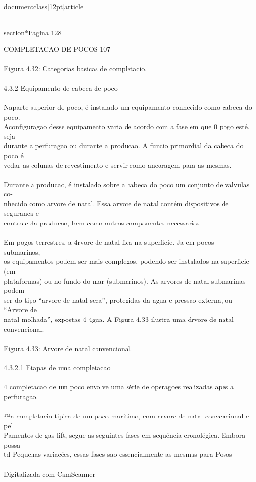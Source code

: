 \\documentclass[12pt]{article}
\begin{document}
\\section*{Pagina 128}

COMPLETACAO DE POCOS 107\\
\\
Figura 4.32: Categorias basicas de completacio.\\
\\
4.3.2 Equipamento de cabeca de poco\\
\\
Naparte superior do poco, é instalado um equipamento conhecido como cabeca do poco.\\
Aconfiguragao desse equipamento varia de acordo com a fase em que 0 pogo esté, seja\\
durante a perfuragao ou durante a producao. A funcio primordial da cabeca do poco é\\
vedar as colunas de revestimento e servir como ancoragem para as mesmas.\\
\\
Durante a producao, é instalado sobre a cabeca do poco um conjunto de valvulas co-\\
nhecido como arvore de natal. Essa arvore de natal contém dispositivos de seguranca e\\
controle da producao, bem como outros componentes necessarios.\\
\\
Em pogos terrestres, a 4rvore de natal fica na superficie. Ja em pocos submarinos,\\
os equipamentos podem ser mais complexos, podendo ser instalados na superficie (em\\
plataformas) ou no fundo do mar (submarinos). As arvores de natal submarinas podem\\
ser do tipo “arvore de natal seca”, protegidas da agua e pressao externa, ou “Arvore de\\
natal molhada”, expostas 4 4gua. A Figura 4.33 ilustra uma drvore de natal convencional.\\
\\
Figura 4.33: Arvore de natal convencional.\\
\\
4.3.2.1 Etapas de uma completacao\\
\\
4 completacao de um poco envolve uma série de operagoes realizadas apés a perfuragao.\\
\\
™a completacio tipica de um poco maritimo, com arvore de natal convencional e pel\\
Pamentos de gas lift, segue as seguintes fases em sequéncia cronolégica. Embora possa\\
td Pequenas variacées, essas fases sao essencialmente as mesmas para Posos\\
\\
Digitalizada com CamScanner\\
\end{document}
